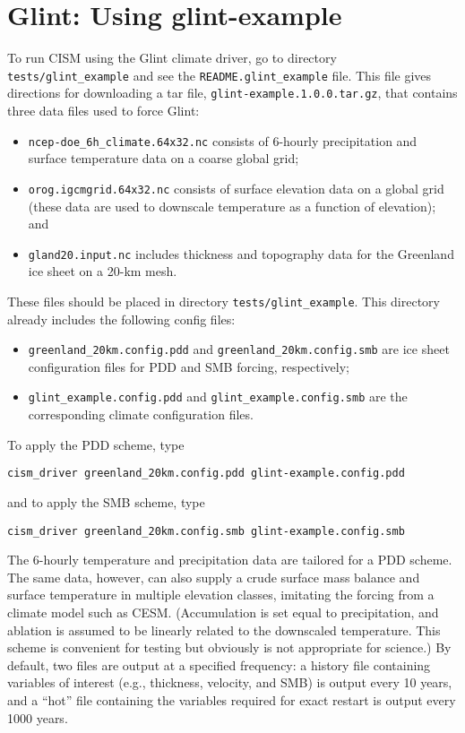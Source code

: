 %


\section{Glint: Using glint-example}
\label{ug.use_glint}
To run CISM using the Glint climate driver, go to directory \texttt{tests/glint\_example} 
and see the \texttt{README.glint\_example} file.
This file gives directions for downloading a tar file,
\texttt{glint-example.1.0.0.tar.gz}, that contains three data files
used to force Glint:
%
\begin{itemize}
\item \texttt{ncep-doe\_6h\_climate.64x32.nc} consists of 6-hourly precipitation and
surface temperature data on a coarse global grid;
\item \texttt{orog.igcmgrid.64x32.nc} consists of surface elevation data on a global grid
(these data are used to downscale temperature as a function of elevation); and
\item \texttt{gland20.input.nc} includes thickness and topography data for the Greenland 
ice sheet on a 20-km mesh.
\end{itemize}
%
These files should be placed in directory \texttt{tests/glint\_example}. 
This directory already includes the following config files:
\begin{itemize}
\item \texttt{greenland\_20km.config.pdd} and \texttt{greenland\_20km.config.smb} are
ice sheet configuration files for PDD and SMB forcing, respectively;
\item \texttt{glint\_example.config.pdd} and \texttt{glint\_example.config.smb} are the
corresponding climate configuration files.
\end{itemize}

To apply the PDD scheme, type
\begin{verbatim}
cism_driver greenland_20km.config.pdd glint-example.config.pdd
\end{verbatim}
%
and to apply the SMB scheme, type
\begin{verbatim}
cism_driver greenland_20km.config.smb glint-example.config.smb
\end{verbatim}
%
The 6-hourly temperature and precipitation data 
are tailored for a PDD scheme.  The same data, however, can also supply a crude
surface mass balance and surface temperature in multiple elevation classes, imitating
the forcing from a climate model such as CESM.  (Accumulation is set equal to precipitation,
and ablation is assumed to be linearly related to the downscaled temperature.
This scheme is convenient for testing but obviously is not appropriate for science.)
By default, two files are output at a specified frequency: a history file
containing variables of interest (e.g., thickness, velocity, and SMB) is output every 10 years,
and a ``hot'' file containing the variables required for exact restart is output every 1000 years.
 
